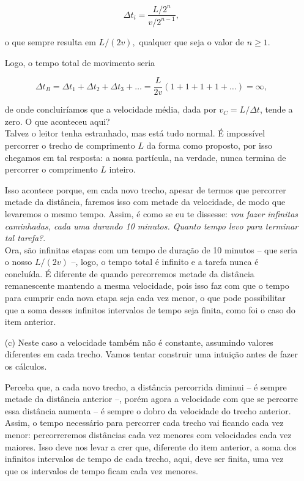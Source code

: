 \begin{exemplo}
\begin{itemize}
$$ \Delta t_i = \dfrac{L/2^n}{v/2^{n-1}},$$

\noindent o que sempre resulta em $L/(2v),$ qualquer que seja o valor de $n \geq 1.$


Logo, o tempo total de movimento seria

$$ \Delta t_B =  \Delta t_1+\Delta t_2+\Delta t_3 + \dots= \dfrac{L}{2v}(1+1+1+1+\dots)= \infty,$$

\noindent de onde concluiríamos que a velocidade média, dada por $v_C = L/\Delta t$, tende a zero. O que aconteceu aqui? \\

Talvez o leitor tenha estranhado, mas está tudo normal. É impossível percorrer o trecho de comprimento $L$ da forma como proposto, por isso chegamos em tal resposta: a nossa partícula, na verdade, nunca termina de percorrer o comprimento $L$ inteiro.

Isso acontece porque, em cada novo trecho, apesar de termos que percorrer metade da distância, faremos isso com metade da velocidade, de modo que levaremos o mesmo tempo. Assim, é como se eu te dissesse: \textit{vou fazer infinitas caminhadas, cada uma durando 10 minutos. Quanto tempo levo para terminar tal tarefa?}. \\

Ora, são infinitas etapas com um tempo de duração de 10 minutos -- que seria o nosso $L/(2v)$ --, logo, o tempo total é infinito e a tarefa nunca é concluída. É diferente de quando percorremos metade da distância remanescente mantendo a mesma velocidade, pois isso faz com que o tempo para cumprir cada nova etapa seja cada vez menor, o que pode possibilitar que a soma desses infinitos intervalos de tempo seja finita, como foi o caso do item anterior.


  \item [(c)] Neste caso a velocidade também não é constante, assumindo valores diferentes em cada trecho. Vamos tentar construir uma intuição antes de fazer os cálculos. 

  Perceba que, a cada novo trecho, a distância percorrida diminui -- é sempre metade da distância anterior --, porém agora a velocidade com que se percorre essa distância aumenta -- é sempre o dobro da velocidade do trecho anterior. Assim, o tempo necessário para percorrer cada trecho vai ficando cada vez menor: percorreremos distâncias cada vez menores com velocidades cada vez maiores. Isso deve nos levar a crer que, diferente do item anterior, a soma dos infinitos intervalos de tempo de cada trecho, aqui, deve ser finita, uma vez que os intervalos de tempo ficam cada vez menores. \\


\end{itemize}
\end{exemplo}
